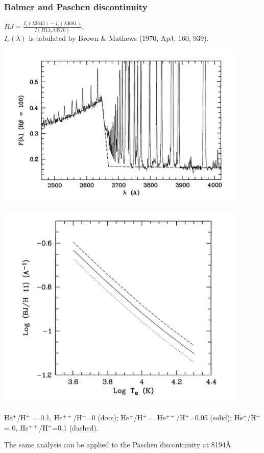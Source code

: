 \begin{frame}\frametitle{Balmer and  Paschen discontinuity   }

\vspace{0cm}
\begin{minipage}[t]{0.48\textwidth}
$BJ = \frac{I_c(\lambda3643)-I_c(\lambda3681)}{I(H11,\lambda3770)}.$
\\ $I_c(\lambda)$ is tabulated by Brown \& Mathews (1970, ApJ, 160,
939).

\begin{center}
  \includegraphics[width=0.9\textwidth,height=!]{./C/bj_liu.jpg} \end{center}
\end{minipage}
\begin{minipage}[t]{0.48\textwidth}
\vspace{-0.5cm}
  \begin{center}
    \includegraphics[width=0.9\textwidth,height=!]{./C/BJ_T.jpg}
  \end{center}

He$^+$/H$^+$ = 0.1, He$^{++}$/H$^+$=0 (dots);
He$^+$/H$^+$ = He$^{++}$/H$^+$=0.05   (solid);
He$^+$/H$^+$ = 0, He$^{++}$/H$^+$=0.1   (dashed).

\end{minipage}

\medskip

The same analysis can be applied to the Paschen discontinuity at
8194\AA.

\end{frame}
